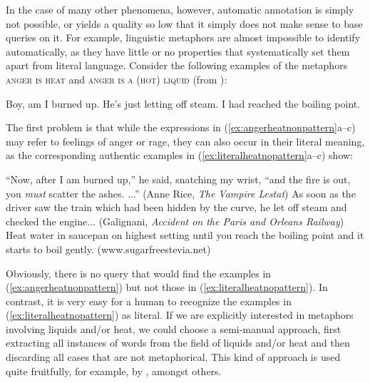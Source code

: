 In the case of many other phenomena, however, automatic annotation  is simply not possible, or yields a quality so low that it simply does not make sense to base queries  on it. For example, linguistic metaphors  are almost impossible to identify automatically, as they have little or no properties that systematically set them apart from literal  language. Consider the following examples of the metaphors \textsc{anger  is heat} and \textsc{anger is a (hot) liquid} (from \citealt[203]{lakoff_cognitive_1987}):

\begin{exe}
\ex
\begin{xlist}
\label{ex:angerheatnonpattern}
\ex Boy, am I burned up.
\ex He's just letting off steam.
\ex I had reached the boiling point.
\end{xlist}
\end{exe}

The first problem is that while the expressions in (\ref{ex:angerheatnonpattern}a--c) may refer to feelings  of anger or rage, they can also occur in their literal  meaning, as the corresponding authentic  examples in (\ref{ex:literalheatnopattern}a--c) show:

\begin{exe}
\ex
\begin{xlist}
\label{ex:literalheatnopattern}
\ex ``Now, after I am burned up,'' he said, snatching my wrist, ``and the fire is out, you \textit{must} scatter the ashes. ...'' (Anne Rice, \textit{The Vampire Lestat})
\ex As soon as the driver saw the train which had been hidden by the curve, he let off steam and checked the engine... (Galignani, \textit{Accident on the Paris and Orleans Railway})
\ex Heat water in saucepan on highest setting until you reach the boiling point and it starts to boil gently. (www.sugarfreestevia.net)
\end{xlist}
\end{exe}

Obviously, there is no query  that would find the examples in (\ref{ex:angerheatnonpattern})  but not those in (\ref{ex:literalheatnopattern}). In contrast, it is very easy for a human to recognize the examples in (\ref{ex:literalheatnopattern}) as literal.  If we are explicitly interested in metaphors  involving liquids and\slash or heat, we could choose a semi\hyp{}manual  approach, first extracting  all instances of words from the field of liquids and\slash or heat and then discarding all cases that are not metaphorical. This kind of approach is used quite fruitfully, for example, by \citet{deignan_metaphor_2005}, amongst others.

